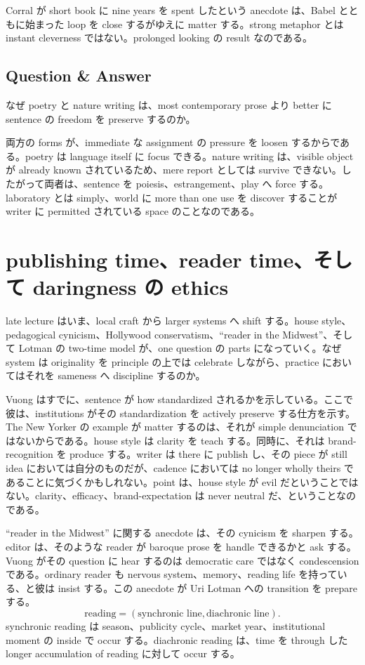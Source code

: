 Corral が short book に nine years を spent したという anecdote は、Babel とともに始まった loop を close するがゆえに matter する。strong metaphor とは instant cleverness ではない。prolonged looking の result なのである。

\subsection{Question \& Answer}

なぜ poetry と nature writing は、most contemporary prose より better に sentence の freedom を preserve するのか。

両方の forms が、immediate な assignment の pressure を loosen するからである。poetry は language itself に focus できる。nature writing は、visible object が already known されているため、mere report としては survive できない。したがって両者は、sentence を poiesis、estrangement、play へ force する。laboratory とは simply、world に more than one use を discover することが writer に permitted されている space のことなのである。

\section{publishing time、reader time、そして daringness の ethics}

late lecture はいま、local craft から larger systems へ shift する。house style、pedagogical cynicism、Hollywood conservatism、``reader in the Midwest''、そして Lotman の two-time model が、one question の parts になっていく。なぜ system は originality を principle の上では celebrate しながら、practice においてはそれを sameness へ discipline するのか。

Vuong はすでに、sentence が how standardized されるかを示している。ここで彼は、institutions がその standardization を actively preserve する仕方を示す。The New Yorker の example が matter するのは、それが simple denunciation ではないからである。house style は clarity を teach する。同時に、それは brand-recognition を produce する。writer は there に publish し、その piece が still idea においては自分のものだが、cadence においては no longer wholly theirs であることに気づくかもしれない。point は、house style が evil だということではない。clarity、efficacy、brand-expectation は never neutral だ、ということなのである。

``reader in the Midwest'' に関する anecdote は、その cynicism を sharpen する。editor は、そのような reader が baroque prose を handle できるかと ask する。Vuong がその question に hear するのは democratic care ではなく condescension である。ordinary reader も nervous system、memory、reading life を持っている、と彼は insist する。この anecdote が Uri Lotman への transition を prepare する。
\begin{equation}
\text{reading} = (\text{synchronic line},\text{diachronic line}).
\end{equation}
synchronic reading は season、publicity cycle、market year、institutional moment の inside で occur する。diachronic reading は、time を through した longer accumulation of reading に対して occur する。

